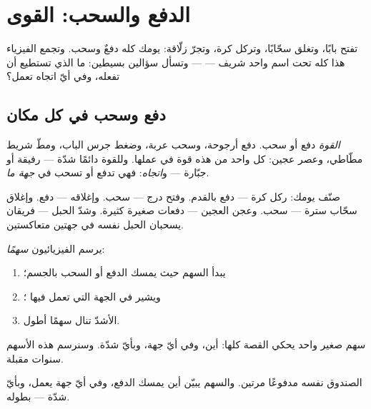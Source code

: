 \chapter{الدفع والسحب: القوى}\label{ch:g2:pushes-and-pulls}

تفتح بابًا، وتغلق سحّابًا، وتركل كرة، وتجرّ زلّاقة: يومك كله
دفعٌ وسحب. وتجمع الفيزياء هذا كله تحت اسم واحد شريف --- 
--- وتسأل سؤالين بسيطين: ما الذي تستطيع  أن تفعله، وفي أيّ
اتجاه تعمل؟

\section{دفع وسحب في كل مكان}

\begin{definition}[القوة]\label{def:g2:pushes-and-pulls:force}
\emph{القوة} دفع أو سحب. دفع أرجوحة، وسحب عربة، وضغط
جرس الباب، ومطّ شريط مطّاطي، وعصر عجين: كل واحد من هذه قوة في
عملها. وللقوة دائمًا شدّة --- رفيقة أو جبّارة --- و\emph{اتجاه}:
فهي تدفع أو تسحب في \emph{جهة ما}.
\end{definition}

\begin{example}\label{ex:g2:pushes-and-pulls:sort}
صنّف يومك: ركل كرة --- دفع بالقدم. وفتح درج --- سحب. وإغلاقه ---
دفع. وإغلاق سحّاب سترة --- سحب. وعجن العجين --- دفعات صغيرة
كثيرة. وشدّ الحبل --- فريقان يسحبان الحبل نفسه في جهتين
متعاكستين.
\end{example}

\begin{method}\label{met:g2:pushes-and-pulls:arrow}
يرسم الفيزيائيون  \emph{سهمًا}:
\begin{enumerate}
  \item يبدأ السهم حيث يمسك الدفع أو السحب بالجسم؛
  \item ويشير في الجهة التي تعمل فيها ؛
  \item {} الأشدّ تنال سهمًا أطول.
\end{enumerate}
سهم صغير واحد يحكي القصة كلها: أين، وفي أيّ جهة، وبأيّ شدّة.
وسنرسم هذه الأسهم سنوات مقبلة.
\end{method}

\begin{omfigure}

{\small الصندوق نفسه مدفوعًا مرتين. والسهم يبيّن أين يمسك الدفع،
وفي أيّ جهة يعمل، وبأيّ شدّة --- بطوله.}
\end{omfigure}

